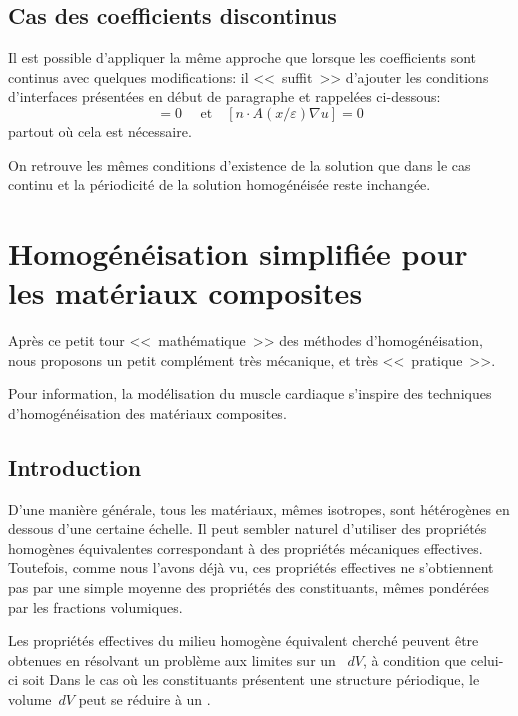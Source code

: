 \medskip
\subsection{Cas des coefficients discontinus}
Il est possible d'appliquer la même approche que lorsque les coefficients sont continus
avec quelques modifications: il <<~suffit~>> d'ajouter les conditions d'interfaces présentées
en début de paragraphe et rappelées ci-dessous:
\begin{equation} [u]=0 \quad \text{ et} \quad [n\cdot A(x/\varepsilon)\nabla u] = 0\end{equation}
partout où cela est nécessaire.

On retrouve les mêmes conditions d'existence de la solution que dans le cas
continu et la périodicité de la solution homogénéisée reste inchangée.



\medskip
\section{Homogénéisation simplifiée pour les matériaux composites}

Après ce petit tour <<~mathématique~>> des méthodes d'homogénéisation,
nous proposons un petit complément très mécanique, et très <<~pratique~>>.

\medskip
Pour information, la modélisation du muscle cardiaque s'inspire des techniques d'homogénéisation
des matériaux composites.


\medskip
\subsection{Introduction}

D'une manière générale, tous les matériaux, mêmes isotropes, sont hétérogènes
en dessous d'une certaine échelle.
Il peut sembler naturel d'utiliser des propriétés homogènes équivalentes correspondant
à des propriétés mécaniques effectives.
Toutefois, comme nous l'avons déjà vu, ces propriétés effectives ne s'obtiennent pas par
une simple moyenne des propriétés des constituants, mêmes pondérées par les fractions
volumiques.

\medskip
Les propriétés effectives du milieu homogène équivalent cherché peuvent être obtenues
en résolvant un problème aux limites sur un ~$dV$, à condition
que celui-ci soit 
Dans le cas où les constituants présentent une structure périodique, le volume~$dV$ peut se
réduire à un .

